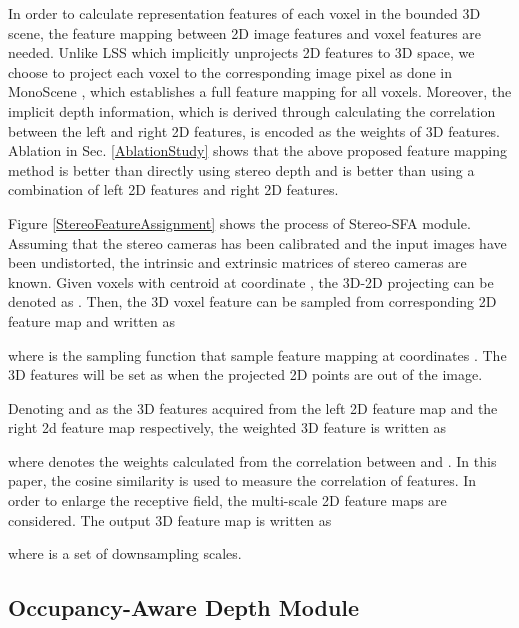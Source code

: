 \documentclass{article}
\begin{document}
	In order to calculate representation features of each voxel in the bounded 3D scene, the feature mapping between 2D image features and voxel features are needed. Unlike LSS \cite{philion2020lift} which implicitly unprojects 2D features to 3D space, we choose to project each voxel to the corresponding image pixel as done in MonoScene \cite{Cao_2022_CVPR}, which establishes a full feature mapping for all voxels. Moreover, the implicit depth information, which is derived through calculating the correlation between the left and right 2D features, is encoded as the weights of 3D features. Ablation in Sec. \ref{AblationStudy} shows that the above proposed feature mapping method is better than directly using stereo depth and is better than using a combination of left 2D features and right 2D features. 
	
	Figure \ref{StereoFeatureAssignment} shows the process of Stereo-SFA module. Assuming that the stereo cameras has been calibrated and the input images have been undistorted, the intrinsic and extrinsic matrices of stereo cameras are known. Given  voxels with centroid at coordinate , the 3D-2D projecting can be denoted as . Then, the 3D voxel feature  can be sampled from corresponding 2D feature map  and written as
	
	where  is the sampling function that sample feature mapping  at coordinates . The 3D features will be set as  when the projected 2D points are out of the image. 
	
	Denoting  and  as the 3D features acquired from the left 2D feature map and the right 2d feature map respectively, the weighted 3D feature  is written as
	
	where  denotes the weights calculated from the correlation between  and . In this paper, the cosine similarity is used to measure the correlation of features.
	In order to enlarge the receptive field, the multi-scale 2D feature maps are considered. The output 3D feature map is written as
	
	where  is a set of downsampling scales.
	
	
	
	\subsection{Occupancy-Aware Depth Module}
	\label{sectionOccupancyAwareDepth}
\end{document}
